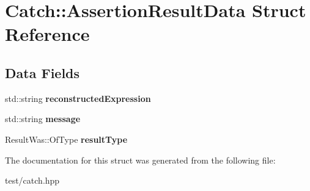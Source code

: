 \hypertarget{structCatch_1_1AssertionResultData}{}\section{Catch\+:\+:Assertion\+Result\+Data Struct Reference}
\label{structCatch_1_1AssertionResultData}
\subsection*{Data Fields}
\begin{DoxyCompactItemize}
\item 
std\+::string {\bfseries reconstructed\+Expression}\hypertarget{structCatch_1_1AssertionResultData_a9e809d36fffbeb1c7d0cbe7382dd9595}{}\label{structCatch_1_1AssertionResultData_a9e809d36fffbeb1c7d0cbe7382dd9595}

\item 
std\+::string {\bfseries message}\hypertarget{structCatch_1_1AssertionResultData_ac34215803c4c4a88f795879f61c1f7b4}{}\label{structCatch_1_1AssertionResultData_ac34215803c4c4a88f795879f61c1f7b4}

\item 
Result\+Was\+::\+Of\+Type {\bfseries result\+Type}\hypertarget{structCatch_1_1AssertionResultData_a7ceab4a7ff722aec5587e3748caf66b7}{}\label{structCatch_1_1AssertionResultData_a7ceab4a7ff722aec5587e3748caf66b7}

\end{DoxyCompactItemize}


The documentation for this struct was generated from the following file\+:\begin{DoxyCompactItemize}
\item 
test/catch.\+hpp\end{DoxyCompactItemize}
